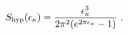 \begin{equation} 
S_{\rm hyp}(\epsilon _{\kappa}) 
=\frac{\epsilon _{\kappa}^{3}}{2\pi ^2(e^{2\pi\epsilon _{\kappa}}-1)}~. 
\end{equation} 
